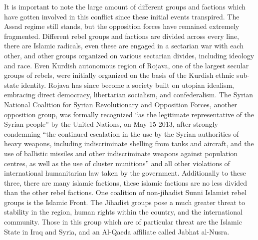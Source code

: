\documentclass[a4paper,titlepage,12pt]{turabian-researchpaper}
\begin{document}
It is important to note the large amount of different groups and factions which have
gotten involved in this conflict since these initial events transpired. The
Assad regime still stands, but the opposition forces have remained extremely fragmented.
Different rebel groups and factions are divided across every line, there are
Islamic radicals, even these are engaged in a sectarian war with each other,
and other groups organized on various sectarian divides, including
ideology and race. Even Kurdish autonomous region of
Rojava, one of the largest secular groups of rebels, were
initially organized on the basis of the Kurdish ethnic sub-state identity.
\autocite[3-4]{sectarian} Rojava has since become a society built on utopian
idealism, embracing direct democracy, libertarian socialism, and confederalism.
\autocite{rojavarev} The Syrian National Coalition for Syrian Revolutionary and
Opposition Forces, another opposition group, was formally recognized ``as the legitimate representative of the
Syrian people'' by the United Nations, on May 15 2013, after strongly
condemning ``the continued escalation in the use by the Syrian
authorities of heavy weapons, including indiscriminate shelling from tanks and
aircraft, and the use of ballistic missiles and other indiscriminate weapons against
population centres, as well as the use of cluster munitions'' and all other
violations of international humanitarian law taken by the government. \autocite{un1}
Additionally to these three, there are many islamic factions, these islamic
factions are no less divided than the other rebel factions. One coalition of
non-jihadist Sunni Islamist rebel groups is the Islamic Front.
\autocite[15]{sectarian} The Jihadist groups pose a much greater threat
to stability in the region, human rights within the country, and the
international community. Those in this group which are of particular threat are
the Islamic State in Iraq and Syria, and an Al-Qaeda affiliate called Jabhat
al-Nusra. \autocite[2]{isis} \autocite{nusra}
\end{document}
